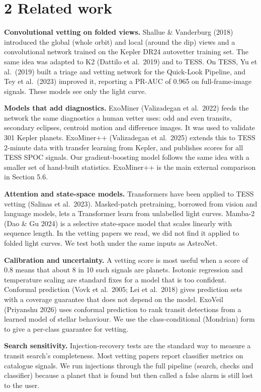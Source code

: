 \documentclass[
]{article}
\begin{document}
\hypertarget{related-work}{%
\section{2 Related work}\label{related-work}}

\textbf{Convolutional vetting on folded views.} Shallue \& Vanderburg
(2018) introduced the global (whole orbit) and local (around the dip)
views and a convolutional network trained on the Kepler DR24 autovetter
training set. The same idea was adapted to K2 (Dattilo et al.~2019) and
to TESS. On TESS, Yu et al.~(2019) built a triage and vetting network
for the Quick-Look Pipeline, and Tey et al.~(2023) improved it,
reporting a PR-AUC of 0.965 on full-frame-image signals. These models
see only the light curve.

\textbf{Models that add diagnostics.} ExoMiner (Valizadegan et al.~2022)
feeds the network the same diagnostics a human vetter uses: odd and even
transits, secondary eclipses, centroid motion and difference images. It
was used to validate 301 Kepler planets. ExoMiner++ (Valizadegan et
al.~2025) extends this to TESS 2-minute data with transfer learning from
Kepler, and publishes scores for all TESS SPOC signals. Our
gradient-boosting model follows the same idea with a smaller set of
hand-built statistics. ExoMiner++ is the main external comparison in
Section 5.6.

\textbf{Attention and state-space models.} Transformers have been
applied to TESS vetting (Salinas et al.~2023). Masked-patch pretraining,
borrowed from vision and language models, lets a Transformer learn from
unlabelled light curves. Mamba-2 (Dao \& Gu 2024) is a selective
state-space model that scales linearly with sequence length. In the
vetting papers we read, we did not find it applied to folded light
curves. We test both under the same inputs as AstroNet.

\textbf{Calibration and uncertainty.} A vetting score is most useful
when a score of 0.8 means that about 8 in 10 such signals are planets.
Isotonic regression and temperature scaling are standard fixes for a
model that is too confident. Conformal prediction (Vovk et al.~2005; Lei
et al.~2018) gives prediction sets with a coverage guarantee that does
not depend on the model. ExoVeil (Priyanshu 2026) uses conformal
prediction to rank transit detections from a learned model of stellar
behaviour. We use the class-conditional (Mondrian) form to give a
per-class guarantee for vetting.

\textbf{Search sensitivity.} Injection-recovery tests are the standard
way to measure a transit search's completeness. Most vetting papers
report classifier metrics on catalogue signals. We run injections
through the full pipeline (search, checks and classifier) because a
planet that is found but then called a false alarm is still lost to the
user.
\end{document}
